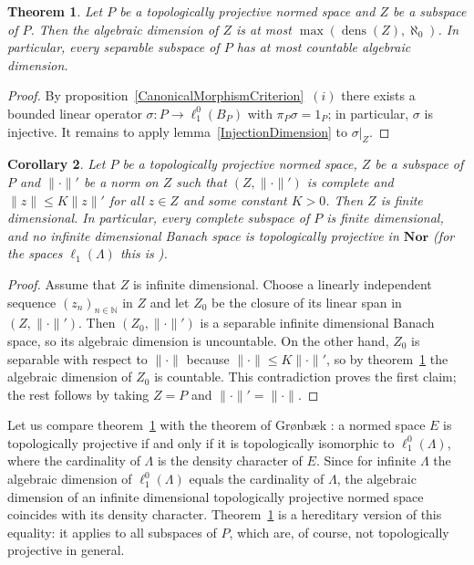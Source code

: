 \documentclass[12pt]{article}
\newtheorem{theorem}{Theorem}[section]
\newtheorem{corollary}[theorem]{Corollary}
\newcommand{\Nor}{\mathbf{Nor}}
\newcommand{\lo}[1]{\ell_1^0(#1)}
\newcommand{\ellone}[1]{\ell_1(#1)}
\newcommand{\norm}[1]{\lVert #1\rVert}
\begin{document}
\begin{theorem}\label{SeparableSubspaces} Let $P$ be a topologically
    projective normed space and $Z$ be a subspace of $P$. Then the algebraic
    dimension of $Z$ is at most $\max(\operatorname{dens}(Z),\aleph_0)$. In
    particular, every separable subspace of $P$ has at most countable
    algebraic dimension.
\end{theorem}
\begin{proof} By proposition~\ref{CanonicalMorphismCriterion}~$(i)$ there
    exists a bounded linear operator $\sigma:P\to\lo{B_P}$ with
    $\pi_P\sigma=1_P$; in particular, $\sigma$ is injective. It remains to
    apply lemma~\ref{InjectionDimension} to $\sigma|_Z$.
\end{proof}

\begin{corollary}\label{NoCompleteSubspaces} Let $P$ be a topologically
    projective normed space, $Z$ be a subspace of $P$ and $\norm{\cdot}'$ be a
    norm on $Z$ such that $(Z,\norm{\cdot}')$ is complete and
    $\norm{z}\leq K\norm{z}'$ for all $z\in Z$ and some constant $K>0$. Then
    $Z$ is finite dimensional. In particular, every complete subspace of $P$
    is finite dimensional, and no infinite dimensional Banach space is
    topologically projective in $\Nor$ (for the spaces $\ellone{\Lambda}$ this
    is \cite[proposition 2.5]{HelExtrProjSeqAlg}).
\end{corollary}
\begin{proof} Assume that $Z$ is infinite dimensional. Choose a linearly
    independent sequence ${(z_n)}_{n\in\mathbb{N}}$ in $Z$ and let $Z_0$ be
    the closure of its linear span in $(Z,\norm{\cdot}')$. Then
    $(Z_0,\norm{\cdot}')$ is a separable infinite dimensional Banach space, so
    its algebraic dimension is uncountable. On the other hand, $Z_0$ is
    separable with respect to $\norm{\cdot}$ because $\norm{\cdot}\leq
    K\norm{\cdot}'$, so by theorem~\ref{SeparableSubspaces} the algebraic
    dimension of $Z_0$ is countable. This contradiction proves the first
    claim; the rest follows by taking $Z=P$ and $\norm{\cdot}'=\norm{\cdot}$.
\end{proof}

Let us compare theorem~\ref{SeparableSubspaces} with the theorem of
Gr{\o}nb{\ae}k \cite[theorem 2.1]{GronLiftProbNormSp}: a normed space $E$ is
topologically projective if and only if it is topologically isomorphic to
$\lo{\Lambda}$, where the cardinality of $\Lambda$ is the density character
of $E$. Since for infinite $\Lambda$ the algebraic dimension of $\lo{\Lambda}$
equals the cardinality of $\Lambda$, the algebraic dimension of an infinite
dimensional topologically projective normed space coincides with its density
character. Theorem~\ref{SeparableSubspaces} is a hereditary version of this
equality: it applies to all subspaces of $P$, which are, of course, not
topologically projective in general.
\end{document}
